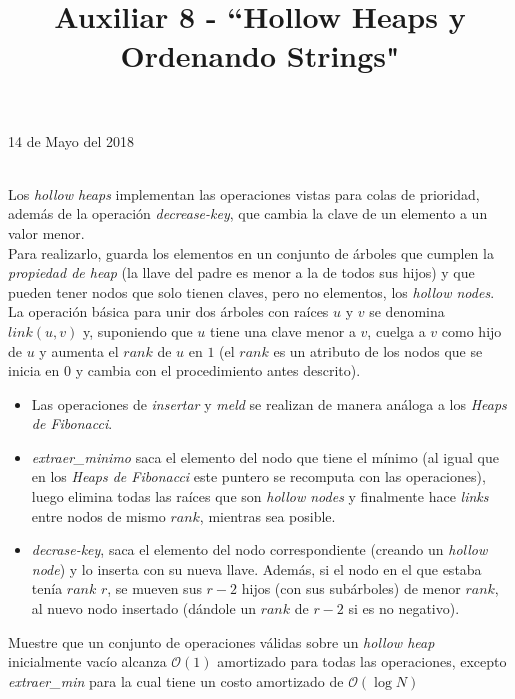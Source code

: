 \documentclass[dcc,uchile]{fcfmcourse}
\title{Auxiliar 8 - ``Hollow Heaps y Ordenando Strings"}
\theoremstyle{plain}
\theoremstyle{definition}
\begin{document}
\maketitle
\begin{center}
14 de Mayo del 2018
\end{center}


\vspace{-1ex}


\begin{problems}
\\
Los \textit{hollow heaps} implementan las operaciones vistas para colas de prioridad, además de la operación \textit{decrease-key}, que cambia la clave de un elemento a un valor menor.\\
Para realizarlo, guarda los elementos en un conjunto de árboles que cumplen la \textit{propiedad de heap} (la llave del padre es menor a la de todos sus hijos) y que pueden tener nodos que solo tienen claves, pero no elementos, los \textit{hollow nodes}.\\
La operación básica para unir dos árboles con raíces $u$ y $v$ se denomina $link(u, v)$ y, suponiendo que $u$ tiene una clave menor a $v$, cuelga a $v$ como hijo de $u$ y aumenta el $rank$ de $u$ en $1$ (el $rank$ es un atributo de los nodos que se inicia en $0$ y cambia con el procedimiento antes descrito).\
\begin{itemize}
    \item Las operaciones de \textit{insertar} y \textit{meld} se realizan de manera análoga a los \textit{Heaps de Fibonacci}.
    \item \textit{extraer\_minimo} saca el elemento del nodo que tiene el mínimo (al igual que en los \textit{Heaps de Fibonacci} este puntero se recomputa con las operaciones), luego elimina todas las raíces que son \textit{hollow nodes} y finalmente hace \textit{links} entre nodos de mismo $rank$, mientras sea posible.
    \item \textit{decrase-key}, saca el elemento del nodo correspondiente (creando un \textit{hollow node}) y lo inserta con su nueva llave. Además, si el nodo en el que estaba tenía $rank$ $r$, se mueven sus $r-2$ hijos (con sus subárboles) de menor $rank$, al nuevo nodo insertado (dándole un $rank$ de $r-2$ si es no negativo).
\end{itemize}
Muestre que un conjunto de operaciones válidas sobre un \textit{hollow heap} inicialmente vacío alcanza $\mathcal{O}(1)$ amortizado para todas las operaciones, excepto \textit{extraer\_min} para la cual tiene un costo amortizado de $\mathcal{O}(\log{N})$

\end{problems}
\end{document}
